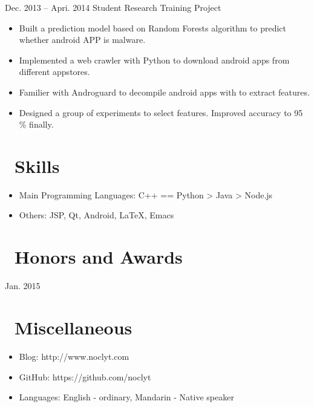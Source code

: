 \documentclass{resume}
\begin{document}
 {Dec. 2013 -- Apri. 2014}
 {Student Research Training Project}
\begin{itemize}
\item
  Built a prediction model based on Random Forests algorithm to predict whether
  android APP is malware.
\item
  Implemented a web crawler with Python to download android apps from different appstores.
\item
  Familier with Androguard to decompile android apps with to extract features.
\item
  Designed a group of experiments to select features. Improved accuracy to 95 \%
  finally.

\end{itemize}


\section{\faCogs\ Skills}
\begin{itemize}[parsep=0.5ex]
  \item Main Programming Languages: C++ == Python > Java > Node.js
  \item Others: JSP, Qt, Android, \LaTeX, Emacs
\end{itemize}

\section{\faHeartO\ Honors and Awards}
 {Jan. 2015}

\section{\faInfo\ Miscellaneous}
\begin{itemize}[parsep=0.5ex]
  \item Blog: http://www.noclyt.com
  \item GitHub: https://github.com/noclyt
  \item Languages: English - ordinary, Mandarin - Native speaker
\end{itemize}

%
%
\end{document}
